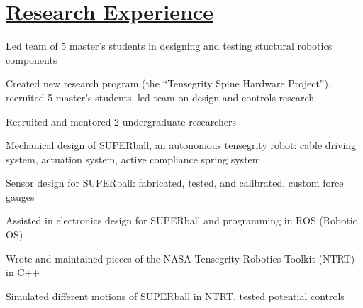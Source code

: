 \documentclass[12pt,letterpaper]{deedy-resume} %
\begin{document}
\begin{minipage}[t]{1\textwidth}%
\section{\underline{Research Experience}}

\vspace{0.2cm}


\vspace{\topsep} %
\begin{tightitemize}
\item Led team of 5 master's students in designing and testing stuctural robotics components
\item Created new research program (the ``Tensegrity Spine Hardware Project''), recruited 5 master's students, led team on design and controls research
\item Recruited and mentored 2 undergraduate researchers
\end{tightitemize}

\sectionspace %



\begin{tightitemize}
\item Mechanical design of SUPERball, an autonomous tensegrity robot: cable driving system, actuation system, active compliance spring system
\item Sensor design for SUPERball: fabricated, tested, and calibrated, custom force gauges
\item Assisted in electronics design for SUPERball and programming in ROS (Robotic OS)
\item Wrote and maintained pieces of the NASA Tensegrity Robotics Toolkit (NTRT) in C++
\item Simulated different motions of SUPERball in NTRT, tested potential controls
\end{tightitemize}


\end{minipage}
\end{document}
